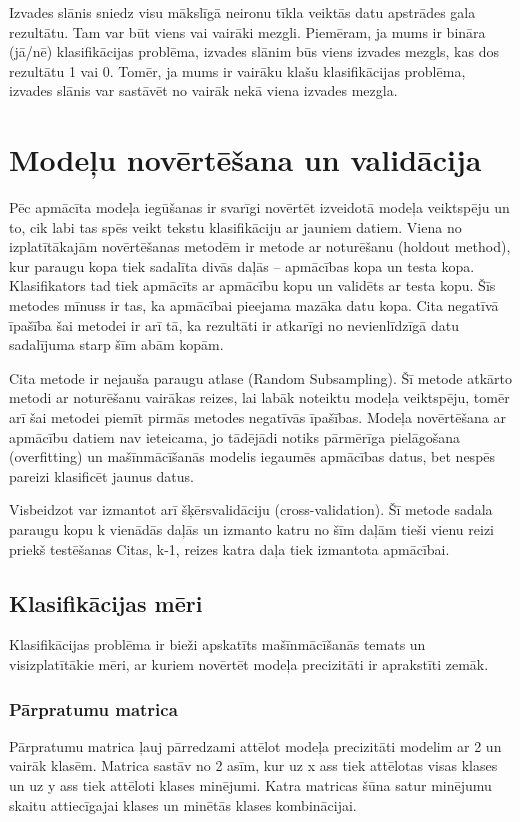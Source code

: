 Izvades slānis sniedz visu mākslīgā neironu tīkla veiktās datu apstrādes gala rezultātu. Tam var būt viens vai vairāki mezgli. Piemēram, ja mums ir bināra (jā/nē) klasifikācijas problēma, izvades slānim būs viens izvades mezgls, kas dos rezultātu 1 vai 0. Tomēr, ja mums ir vairāku klašu klasifikācijas problēma, izvades slānis var sastāvēt no vairāk nekā viena izvades mezgla.

\section{Modeļu novērtēšana un validācija}
Pēc apmācīta modeļa iegūšanas ir svarīgi novērtēt izveidotā modeļa veiktspēju un to, cik labi tas spēs veikt tekstu klasifikāciju ar jauniem datiem. 
Viena no izplatītākajām novērtēšanas metodēm ir metode ar noturēšanu (holdout method), kur paraugu kopa tiek sadalīta divās daļās – apmācības kopa un testa kopa. Klasifikators tad tiek apmācīts ar apmācību kopu un validēts ar testa kopu. Šīs metodes mīnuss ir tas, ka apmācībai pieejama mazāka datu kopa. Cita negatīvā īpašība šai metodei ir arī tā, ka rezultāti ir atkarīgi no nevienlīdzīgā datu sadalījuma starp šīm abām kopām.

Cita metode ir nejauša paraugu atlase (Random Subsampling). Šī metode atkārto metodi ar noturēšanu vairākas reizes, lai labāk noteiktu modeļa veiktspēju, tomēr arī šai metodei piemīt pirmās metodes negatīvās īpašības.
Modeļa novērtēšana ar apmācību datiem nav ieteicama, jo tādējādi notiks pārmērīga pielāgošana (overfitting) un mašīnmācīšanās modelis iegaumēs apmācības datus, bet nespēs pareizi klasificēt jaunus datus.

Visbeidzot var izmantot arī šķērsvalidāciju (cross-validation). Šī metode sadala paraugu kopu k vienādās daļās un izmanto katru no šīm daļām tieši vienu reizi priekš testēšanas  Citas, k-1, reizes katra daļa tiek izmantota apmācībai.

\subsection{Klasifikācijas mēri}
\renewcommand{\theequation}{2.\arabic{equation}}
Klasifikācijas problēma ir bieži apskatīts mašīnmācīšanās temats un visizplatītākie mēri, ar kuriem novērtēt modeļa precizitāti ir aprakstīti zemāk.

\subsubsection{Pārpratumu matrica}
Pārpratumu matrica ļauj pārredzami attēlot modeļa precizitāti modelim ar 2 un vairāk klasēm. Matrica sastāv no 2 asīm, kur uz x ass tiek attēlotas visas klases un uz y ass tiek attēloti klases minējumi. Katra matricas šūna satur minējumu skaitu attiecīgajai klases un minētās klases kombinācijai.

